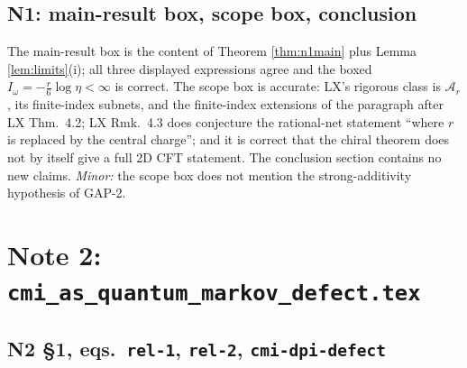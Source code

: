 \documentclass[11pt]{article}
\newcommand{\Ar}{\mathcal A_r}
\newcommand{\loc}[1]{{\small\texttt{#1}}}
\newcommand{\1}{\mathbf 1}
\begin{document}
\subsection{N1: main-result box, scope box, conclusion}
\begin{verdictok}
The main-result box is the content of Theorem \ref{thm:n1main} plus Lemma \ref{lem:limits}(i);
all three displayed expressions agree and the boxed $I_\omega=-\frac r6\log\eta<\infty$ is correct.
The scope box is accurate: LX's rigorous class is $\Ar$, its finite-index subnets, and the finite-index
extensions of the paragraph after LX Thm.~4.2; LX Rmk.~4.3 does conjecture the rational-net statement
``where $r$ is replaced by the central charge''; and it is correct that the chiral theorem does not by
itself give a full 2D CFT statement. The conclusion section contains no new claims.
\emph{Minor:} the scope box does not mention the strong-additivity hypothesis of GAP-2.
\end{verdictok}

\section{Note 2: \texorpdfstring{\loc{cmi\_as\_quantum\_markov\_defect.tex}}{Note 2}}\label{sec:n2}

\subsection{N2 \S1, eqs.\ \loc{rel-1}, \loc{rel-2}, \loc{cmi-dpi-defect}}
\end{document}

